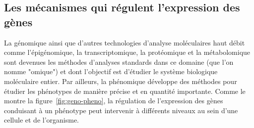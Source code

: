 \subsection{Les mécanismes qui régulent l'expression des gènes}
La génomique ainsi que d'autres technologies d'analyse moléculaires haut débit comme l'épigénomique, la transcriptomique, la protéomique et la métabolomique sont devenues les méthodes d'analyses standards dans ce domaine (que l'on nomme "omique") et dont l'objectif est d'étudier le système biologique moléculaire entier. Par ailleurs, la phénomique développe des méthodes pour étudier les phénotypes de manière précise et en quantité importante. Comme le montre la figure~\ref{fig:geno-pheno}, la régulation de l'expression des gènes conduisant à un phénotype peut intervenir à différents niveaux au sein d'une cellule et de l'organisme. \\
